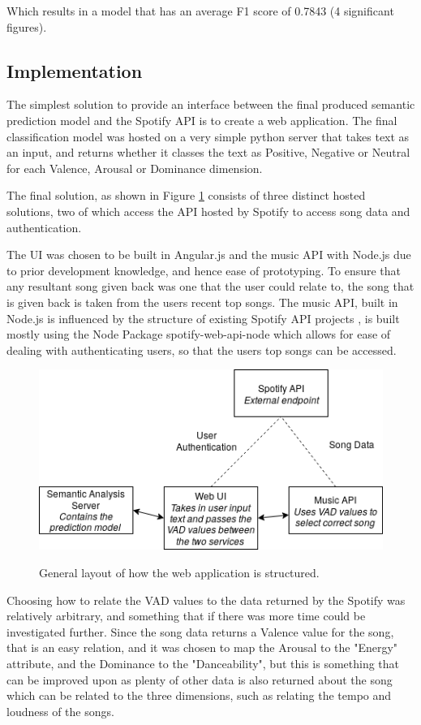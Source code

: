 Which results in a model that has an average F1 score of 0.7843 (4 significant figures). 

\subsection{Implementation}

The simplest solution to provide an interface between the final produced semantic prediction model and the Spotify API is to create a web application. The final classification model was hosted on a very simple python server that takes text as an input, and returns whether it classes the text as Positive, Negative or Neutral for each Valence, Arousal or Dominance dimension. 

The final solution, as shown in Figure \ref{implementationLayout} consists of three distinct hosted solutions, two of which access the API hosted by Spotify to access song data and authentication.

The UI was chosen to be built in Angular.js and the music API with Node.js due to prior development knowledge, and hence ease of prototyping. 
To ensure that any resultant song given back was one that the user could relate to, the song that is given back is taken from the users recent top songs. 
The music API, built in Node.js is influenced by the structure of existing Spotify API projects \cite{moodtape}, is built mostly using the Node Package spotify-web-api-node \cite{nodeSpotify} which allows for ease of dealing with authenticating users, so that the users top songs can be accessed.

\begin{figure}[ht]
\caption{General layout of how the web application is structured.}
\centering
\includegraphics[scale=0.6]{litImgs/interfaceLayout.png}
\label{implementationLayout}
\end{figure}
                

Choosing how to relate the VAD values to the data returned by the Spotify was relatively arbitrary, and something that if there was more time could be investigated further. Since the song data returns a Valence value for the song, that is an easy relation, and it was chosen to map the Arousal to the "Energy" attribute, and the Dominance to the "Danceability", but this is something that can be improved upon as plenty of other data is also returned about the song which can be related to the three dimensions, such as relating the tempo and loudness of the songs.


